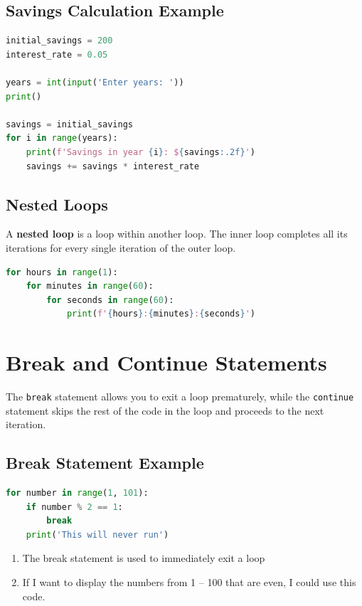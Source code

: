 \documentclass{article}
\begin{document}
\subsection{Savings Calculation Example}

\begin{lstlisting}[language=Python]
initial_savings = 200
interest_rate = 0.05

years = int(input('Enter years: '))
print()

savings = initial_savings
for i in range(years):
    print(f'Savings in year {i}: ${savings:.2f}')
    savings += savings * interest_rate

\end{lstlisting}

\subsection{Nested Loops}
A \textbf{nested loop} is a loop within another loop. The inner loop completes all its iterations for every single iteration of the outer loop.

\begin{lstlisting}[language=Python]
for hours in range(1):
    for minutes in range(60):
        for seconds in range(60):
            print(f'{hours}:{minutes}:{seconds}')
\end{lstlisting}
\section{Break and Continue Statements}
The \texttt{break} statement allows you to exit a loop prematurely, while the \texttt{continue} statement skips the rest of the code in the loop and proceeds to the next iteration.

\subsection{Break Statement Example}

\begin{lstlisting}[language=Python]
for number in range(1, 101):
    if number % 2 == 1:
        break
    print('This will never run')
\end{lstlisting}
\begin{enumerate}
    \item The break statement is used to immediately exit a loop
    \item If I want to display the numbers from 1 – 100 that are even, I could use this code.
\end{enumerate}
\end{document}
